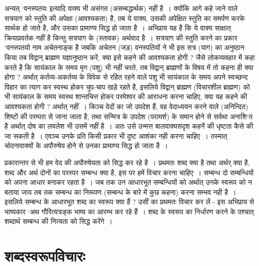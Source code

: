 {अन्यत् ‘वनस्पतयः इत्यादि वाक्य भी असंगत (असम्बद्धार्थक) नहीं है~। क्योंकि आगे कहे जाने वाले सत्रयाग को स्तुति की अपेक्षा (आवश्यकता) है, तब ये वाक्य, उसकी अपेक्षित स्तुति का समर्पण करके सार्थक हो जाते है, और उसका प्रामाण्य सिद्ध हो जाता है~। अभिप्राय यह है कि ये वाक्य साक्षात्  क्रियाप्रवर्तक नहीं है किन्तु सत्रयाग के (स्तावक) अर्थवाद है~। सत्रयाग की स्तुति करने का प्रकार ‘वनस्पतयो नाम अचेतनाङ्क है जबकि अचेतन (जड़) वनस्पतियों ने भी इस सत्र (याग) का अनुष्ठान किया तब विद्वान् ब्राह्मण यज्ञानुष्ठान करें, क्या इसे कहने की आवश्यकता होगी ? जैसे लोकव्यवहार में कहा करते है कि सायंकाल के समय मृग (पशु) भी नहीं चरते, तब विद्वान् ब्राह्मणों के विषय में तो कहना ही क्या होगा ? अर्थात् कर्तव्य-अकर्तव्य के विवेक से रहित रहने वाले पशु भी सायंकाल के समय अपने स्वच्छन्द विहार का त्याग कर स्वस्थ होकर चुप-चाप खड़े रहते है, इसलिये विद्वान् ब्राह्मण (विचारशील ब्राह्मण) को भी सायंकाल के समय स्वस्थ शान्तचित्त होकर परमेश्वर की आराधना करना चाहिए, क्या यह कहने की आवश्यकता होगी ? अर्थात् नहीं~। किञ्च वेदों का जो उपदेश हैं, वह वेदाध्ययन करने वाले (अनिन्दित) शिष्टों की परम्परा से जाना जाता है, तथा सन्मित्र के उपदेश (परामर्श) के समान होने से सर्वथा अनाशि‘त है अर्थात् दोष का लवलेश भी उसमें नहीं है~। अतः उसे उन्मत्त बालवाक्यसदृश कहनें की धृष्टता कैसे की जा सकती है~। एवञ्च उनके प्रति किसी प्रकार भी दुष्ट आशंका नही करना चाहिए~। तस्मात् चोदनावाक्यों के अपौरुषेय होने से उनका प्रामाण्य सिद्ध हो जाता है~।

प्रकारान्तर से भी हम वेद की अपौरुषेयता को सिद्ध कर रहे है~। प्रथमतः शब्द क्या है तथा अर्थर् क्या है, शब्द और अर्थ दोनों का परस्पर सम्बन्ध क्या है, इस पर हमें विचार करना चाहिए~। सम्बन्ध दो सम्बन्धियों को अपना आधार बनाकर रहता है~। जब तक उन आधारभूत सम्बन्धियों को अर्थात् उनके स्वरूप को न बताया जाय तब तक सम्बन्ध का निरूपण (सम्बन्ध के बारे में कुछ कहना) करना सम्भव नही है~। इसलिये सम्बन्ध के आधारभूत शब्द का स्वरूप क्या हैं ? उसीं का प्रथमतः विचार कर लें - इस अभिप्राय से भाष्यकार ‘अथ गौरित्यत्रङ्क भाष्य का आरम्भ कर रहे हैं~। शब्द के स्वरूप का निर्धारण करने के पश्चात् शब्दार्थ सम्बन्ध की नित्यता को सिद्ध करेंगे~।

\section*{शब्दस्वरूपविचारः}

}
